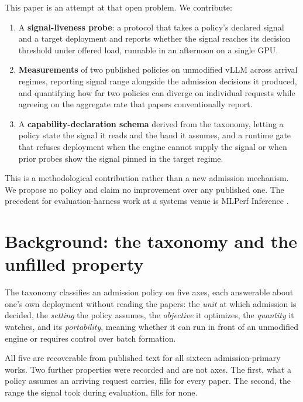 This paper is an attempt at that open problem. We contribute:

\begin{enumerate}
  \item A \textbf{signal-liveness probe}: a protocol that takes a policy's
    declared signal and a target deployment and reports whether the signal
    reaches its decision threshold under offered load, runnable in an afternoon
    on a single GPU.
  \item \textbf{Measurements} of two published policies on unmodified vLLM
    across arrival regimes, reporting signal range alongside the admission
    decisions it produced, and quantifying how far two policies can diverge on
    individual requests while agreeing on the aggregate rate that papers
    conventionally report.
  \item A \textbf{capability-declaration schema} derived from the taxonomy,
    letting a policy state the signal it reads and the band it assumes, and a
    runtime gate that refuses deployment when the engine cannot supply the
    signal or when prior probes show the signal pinned in the target regime.
\end{enumerate}

This is a methodological contribution rather than a new admission mechanism. We
propose no policy and claim no improvement over any published one. The precedent
for evaluation-harness work at a systems venue is MLPerf Inference
\citep{reddi2020mlperf}.

\section{Background: the taxonomy and the unfilled property}
\label{sec:background}

The taxonomy classifies an admission policy on five axes, each answerable about
one's own deployment without reading the papers: the \emph{unit} at which
admission is decided, the \emph{setting} the policy assumes, the
\emph{objective} it optimizes, the \emph{quantity} it watches, and its
\emph{portability}, meaning whether it can run in front of an unmodified engine
or requires control over batch formation.

All five are recoverable from published text for all sixteen admission-primary
works. Two further properties were recorded and are not axes. The first, what a
policy assumes an arriving request carries, fills for every paper. The second,
the range the signal took during evaluation, fills for none.

